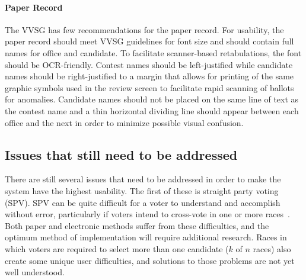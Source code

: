 \paragraph{Paper Record}
The VVSG has few recommendations for the paper record. For usability,
the paper record should meet VVSG guidelines for font size and should
contain full names for office and candidate. To facilitate scanner-based
retabulations, the font should be OCR-friendly. Contest names should be
left-justified while candidate names should be right-justified to a
margin that allows for printing of the same graphic symbols used in the
review screen to facilitate rapid scanning of ballots for anomalies.
Candidate names should not be placed on the same line of text as the
contest name and a thin horizontal dividing line should appear between
each office and the next in order to minimize possible visual confusion.

\subsection{Issues that still need to be addressed}
There are still several issues that need to be addressed in order to make the system have the highest usability. The first of these is straight party voting (SPV). SPV can be quite difficult for a voter to understand and accomplish without error, particularly if voters intend to cross-vote in one or more races~\cite{campbell-ieee}. Both paper and electronic methods suffer from these difficulties, and the optimum method of implementation will require additional research. Races in which voters are required to select more than one candidate ($k$ of $n$ races) also create some unique user difficulties, and solutions to those problems are not yet well understood. 




